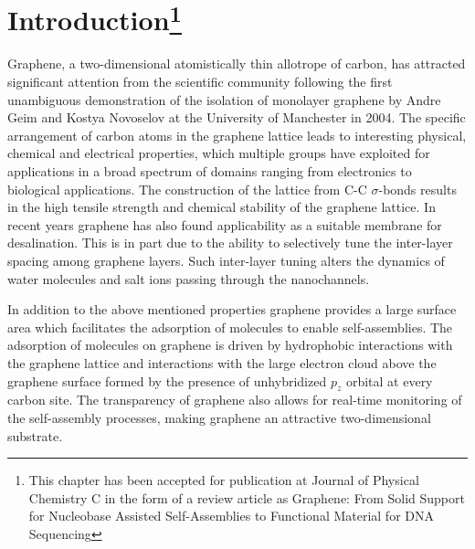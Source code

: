 \chapter[Introduction]{Introduction\protect\footnote{This chapter has been accepted for publication at Journal of Physical Chemistry C in the form of a review article as Graphene: From Solid Support for Nucleobase Assisted Self-Assemblies to Functional Material for DNA Sequencing}}

Graphene, a two-dimensional atomistically thin allotrope of carbon, has attracted significant attention from the scientific community following the first unambiguous demonstration of the isolation of monolayer graphene by Andre Geim and Kostya Novoselov at the University of Manchester in 2004\supercite{geim_rise_2007, geim_graphene_2009}. The specific arrangement of carbon atoms in the graphene lattice leads to interesting physical, chemical and electrical properties, which multiple groups have exploited for applications in a broad spectrum of domains\supercite{berman_few_2013,chen_oxidation_2011, cui_cautionary_2017, su_impermeable_2014, berry_impermeability_2013, hayatdavoudi_mechanistic_2017} ranging from electronics\supercite{moreno_bottom-up_2018, fan_graphene_2019,sun_graphene_2010, kim_graphene-contact_2012, avouris_graphene_2010, baeumer_ferroelectrically_2015, bao_atomic-layer_2009,blake_graphene-based_2008, trung_graphene_2022,wang_transparent_2008, liu_ultratransparent_2017, shin_stretchable_2019,kim_large-scale_2009, polat_graphene_2014, anagnostopoulos_mechanical_2016,bae_roll--roll_2010, khan_graphene_2017} to biological applications\supercite{akinwande_large-area_2015,lalwani_two-dimensional_2013,mohanty_graphene-based_2008,ohno_label-free_2010,chen_electronic_2012,he_graphene_2010}. The construction of the lattice from C-C $\sigma$-bonds results in the high tensile strength and chemical stability of the graphene lattice.\supercite{booth_macroscopic_2008, lee_measurement_2008} In recent years graphene has also found applicability as a suitable membrane for desalination. This is  in part due to the ability to selectively tune the inter-layer spacing among graphene layers. Such inter-layer tuning alters the dynamics of water molecules and salt ions passing through the nanochannels.\supercite{abraham_tunable_2017, nair_unimpeded_2012, gopinadhan_complete_2019, radha_molecular_2016, saini_selective_2022, yang_self-assembly_2018, paechotrattanakul_ultrahigh_2023, gao_confined_2022, gao_graphene_2022}

In addition to the above mentioned properties graphene provides a large surface area which facilitates the adsorption of molecules to enable self-assemblies. The adsorption of molecules on graphene is driven by hydrophobic interactions with the graphene lattice and interactions with the large electron cloud above the graphene surface formed by the presence of unhybridized $p_z$ orbital at every carbon site. The transparency of graphene also allows for real-time monitoring of the self-assembly processes, making graphene an attractive two-dimensional substrate.\supercite{xu_coadsorption_2006, zhao_investigating_2016, hason_arrangements_2023, xu_directional_2021, garah_guanosine-based_2015, hughes_adsorption_2017, hassan_interactions_2014, hsun_su_electrostatic_2011} 

